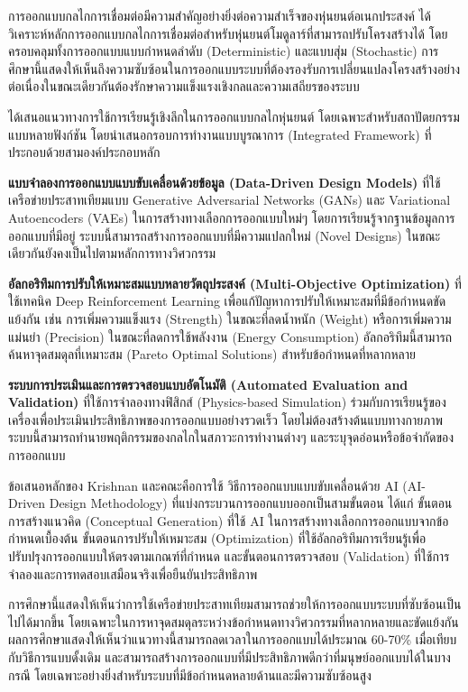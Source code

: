 \documentclass[a4paper]{article}
\begin{document}
การออกแบบกลไกการเชื่อมต่อมีความสำคัญอย่างยิ่งต่อความสำเร็จของหุ่นยนต์อเนกประสงค์ \textcite{liang2025decoding} ได้วิเคราะห์หลักการออกแบบกลไกการเชื่อมต่อสำหรับหุ่นยนต์โมดูลาร์ที่สามารถปรับโครงสร้างได้ โดยครอบคลุมทั้งการออกแบบแบบกำหนดลำดับ (Deterministic) และแบบสุ่ม (Stochastic) การศึกษานี้แสดงให้เห็นถึงความซับซ้อนในการออกแบบระบบที่ต้องรองรับการเปลี่ยนแปลงโครงสร้างอย่างต่อเนื่องในขณะเดียวกันต้องรักษาความแข็งแรงเชิงกลและความเสถียรของระบบ

\textcite{krishnan2023deep} ได้เสนอแนวทางการใช้การเรียนรู้เชิงลึกในการออกแบบกลไกหุ่นยนต์ โดยเฉพาะสำหรับสถาปัตยกรรมแบบหลายฟังก์ชัน โดยนำเสนอกรอบการทำงานแบบบูรณาการ (Integrated Framework) ที่ประกอบด้วยสามองค์ประกอบหลัก

\textbf{แบบจำลองการออกแบบแบบขับเคลื่อนด้วยข้อมูล (Data-Driven Design Models)} ที่ใช้เครือข่ายประสาทเทียมแบบ Generative Adversarial Networks (GANs) และ Variational Autoencoders (VAEs) ในการสร้างทางเลือกการออกแบบใหม่ๆ โดยการเรียนรู้จากฐานข้อมูลการออกแบบที่มีอยู่ ระบบนี้สามารถสร้างการออกแบบที่มีความแปลกใหม่ (Novel Designs) ในขณะเดียวกันยังคงเป็นไปตามหลักการทางวิศวกรรม

\textbf{อัลกอริทึมการปรับให้เหมาะสมแบบหลายวัตถุประสงค์ (Multi-Objective Optimization)} ที่ใช้เทคนิค Deep Reinforcement Learning เพื่อแก้ปัญหาการปรับให้เหมาะสมที่มีข้อกำหนดขัดแย้งกัน เช่น การเพิ่มความแข็งแรง (Strength) ในขณะที่ลดน้ำหนัก (Weight) หรือการเพิ่มความแม่นยำ (Precision) ในขณะที่ลดการใช้พลังงาน (Energy Consumption) อัลกอริทึมนี้สามารถค้นหาจุดสมดุลที่เหมาะสม (Pareto Optimal Solutions) สำหรับข้อกำหนดที่หลากหลาย

\textbf{ระบบการประเมินและการตรวจสอบแบบอัตโนมัติ (Automated Evaluation and Validation)} ที่ใช้การจำลองทางฟิสิกส์ (Physics-based Simulation) ร่วมกับการเรียนรู้ของเครื่องเพื่อประเมินประสิทธิภาพของการออกแบบอย่างรวดเร็ว โดยไม่ต้องสร้างต้นแบบทางกายภาพ ระบบนี้สามารถทำนายพฤติกรรมของกลไกในสภาวะการทำงานต่างๆ และระบุจุดอ่อนหรือข้อจำกัดของการออกแบบ

ข้อเสนอหลักของ Krishnan และคณะคือการใช้ วิธีการออกแบบแบบขับเคลื่อนด้วย AI (AI-Driven Design Methodology) ที่แบ่งกระบวนการออกแบบออกเป็นสามขั้นตอน ได้แก่ ขั้นตอนการสร้างแนวคิด (Conceptual Generation) ที่ใช้ AI ในการสร้างทางเลือกการออกแบบจากข้อกำหนดเบื้องต้น ขั้นตอนการปรับให้เหมาะสม (Optimization) ที่ใช้อัลกอริทึมการเรียนรู้เพื่อปรับปรุงการออกแบบให้ตรงตามเกณฑ์ที่กำหนด และขั้นตอนการตรวจสอบ (Validation) ที่ใช้การจำลองและการทดสอบเสมือนจริงเพื่อยืนยันประสิทธิภาพ

การศึกษานี้แสดงให้เห็นว่าการใช้เครือข่ายประสาทเทียมสามารถช่วยให้การออกแบบระบบที่ซับซ้อนเป็นไปได้มากขึ้น โดยเฉพาะในการหาจุดสมดุลระหว่างข้อกำหนดทางวิศวกรรมที่หลากหลายและขัดแย้งกัน ผลการศึกษาแสดงให้เห็นว่าแนวทางนี้สามารถลดเวลาในการออกแบบได้ประมาณ 60-70\% เมื่อเทียบกับวิธีการแบบดั้งเดิม และสามารถสร้างการออกแบบที่มีประสิทธิภาพดีกว่าที่มนุษย์ออกแบบได้ในบางกรณี โดยเฉพาะอย่างยิ่งสำหรับระบบที่มีข้อกำหนดหลายด้านและมีความซับซ้อนสูง
\end{document}
